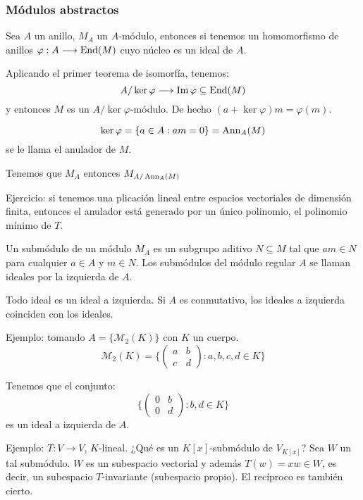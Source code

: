 \subsubsection{Módulos abstractos}

Sea \(A\) un anillo, \(M_A\) un \(A\)-módulo,
entonces si tenemos
un homomorfismo de anillos \(\varphi:A\longrightarrow\operatorname{End}(M)\)
cuyo núcleo es un ideal de \(A\).

Aplicando el primer teorema de isomorfía, tenemos:
\[
  A/\ker\varphi\longrightarrow\Im\varphi\subseteq\operatorname{End}(M)
\]
y entonces \(M\) es un \(A/\ker\varphi\)-módulo.
De hecho \((a+\ker\varphi)m=\varphi(m)\).

\[
  \ker\varphi=\{a\in A: am=0\}=\operatorname{Ann}_A(M)
\]
se le llama el anulador de \(M\).

Tenemos que \(M_A\) entonces \(M_{A/\operatorname{Ann}_A(M)}\)

Ejercicio: si tenemos una plicación lineal entre espacios vectoriales
de dimensión finita, entonces el anulador está generado por un único
polinomio, el polinomio mínimo de \(T\).

\begin{df}
  Un submódulo de un módulo \(M_A\) es un subgrupo aditivo \(N\subseteq M\)
  tal que \(am\in N\) para cualquier \(a\in A\) y \(m\in N\). Los
  submódulos del módulo regular \(A\) se llaman ideales por la izquierda
  de \(A\).
\end{df}

\begin{obs}
  Todo ideal es un ideal a izquierda. Si \(A\) es conmutativo, los ideales
  a izquierda coinciden con los ideales.
\end{obs}

Ejemplo: tomando \(A=\{\mathcal{M}_2(K)\}\) con \(K\) un cuerpo.
\[
  \mathcal{M}_2(K)=\{
    \begin{pmatrix}
      a&b\\
      c&d
    \end{pmatrix}:
    a,b,c,d\in K
  \}
\]

Tenemos que el conjunto:
\[
  \{
    \begin{pmatrix}
      0&b\\
      0&d
    \end{pmatrix}:
    b,d\in K
  \}
\]
es un ideal a izquierda de \(A\).

Ejemplo: \(T:V\longrightarrow V\), \(K\)-lineal.
¿Qué es un \(K[x]\)-submódulo de \(V_{K[x]}\)?
Sea \(W\) un tal submódulo.
\(W\) es un subespacio vectorial y además \(T(w)=xw\in W\),
es decir, un subespacio \(T\)-invariante (subespacio propio).
El recíproco es también cierto.

